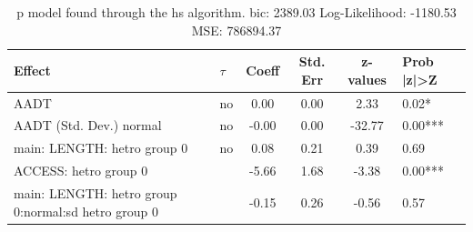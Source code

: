 \begin{table}
	\caption{p model found through the hs algorithm. bic: 2389.03 Log-Likelihood: -1180.53 MSE: 786894.37}
	\begin{center}
		\begin{tabular}{|l|l|c|c|c|l|}
			\hline
			Effect & $\tau$ & Coeff & Std. Err & z-values & Prob |z|>Z \\
			\hline
			AADT & no & 0.00 & 0.00 & 2.33 & 0.02* \\
			\hline
			AADT (Std. Dev.) normal & no & -0.00 & 0.00 & -32.77 & 0.00*** \\
			\hline
			main: LENGTH: hetro group 0 & no & 0.08 & 0.21 & 0.39 & 0.69 \\
			\hline
			ACCESS: hetro group 0 &  & -5.66 & 1.68 & -3.38 & 0.00*** \\
			\hline
			main: LENGTH: hetro group 0:normal:sd  hetro group 0 &  & -0.15 & 0.26 & -0.56 & 0.57 \\
			\hline
		\end{tabular}
	\end{center}
\end{table}